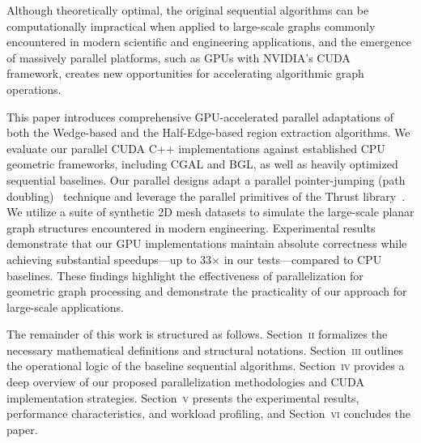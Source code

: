 Although theoretically optimal, the original sequential algorithms can be computationally impractical when applied to large-scale graphs commonly encountered in modern scientific and engineering applications, and the emergence of massively parallel platforms, such as GPUs with NVIDIA's CUDA~\cite{10.1145/1401132.1401152} framework, creates new opportunities for accelerating algorithmic graph operations.


This paper introduces comprehensive GPU-accelerated parallel adaptations of both the Wedge-based and the Half-Edge-based region extraction algorithms. We evaluate our parallel CUDA C++ implementations against established CPU geometric frameworks, including CGAL and BGL, as well as heavily optimized sequential baselines. Our parallel designs adapt a parallel pointer-jumping (path doubling)~\cite{jaja1992} technique and leverage the parallel primitives of the Thrust library~\cite{BELL2012359}. We utilize a suite of synthetic 2D mesh datasets to simulate the large-scale planar graph structures encountered in modern engineering. Experimental results demonstrate that our GPU implementations maintain absolute correctness while achieving substantial speedups—up to 33$\times$ in our tests—compared to CPU baselines. These findings highlight the effectiveness of parallelization for geometric graph processing and demonstrate the practicality of our approach for large-scale applications.

The remainder of this work is structured as follows. Section~\textsc{ii} formalizes the necessary mathematical definitions and structural notations. Section~\textsc{iii} outlines the operational logic of the baseline sequential algorithms. Section~\textsc{iv} provides a deep overview of our proposed parallelization methodologies and CUDA implementation strategies. Section~\textsc{v} presents the experimental results, performance characteristics, and workload profiling, and Section~\textsc{vi} concludes the paper.